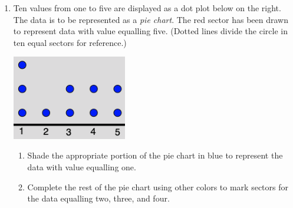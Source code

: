 \documentclass[12pt, twoside]{article}
\begin{document}
\begin{enumerate}
\newpage
\item Ten values from one to five are displayed as a dot plot below on the right. \\[0.5cm]
The data is to be represented as a \emph{pie chart}. The red sector has been drawn to represent data with value equalling five. (Dotted lines divide the circle in ten equal sectors for reference.)
  \begin{multicols}{2}
  \includegraphics[width=5cm]{8-5_10DotPlot.png}
  \end{multicols}
  \begin{enumerate}
    \item Shade the appropriate portion of the pie chart in blue to represent the data with value equalling one.
    \item Complete the rest of the pie chart using other colors to mark sectors for the data equalling two, three, and four.
  \end{enumerate}

\end{enumerate}
\end{document}
